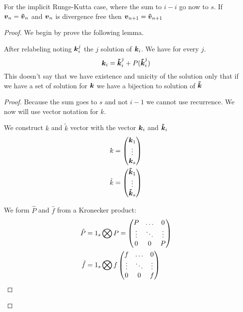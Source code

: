 \begin{theorem}
For the implicit Runge-Kutta case, where the sum to $i-i$ go now to $s$.
If ${\boldsymbol {v}}_{n}={\boldsymbol {\tilde{v}}}_{n}$ and ${\boldsymbol {v}}_n$ is divergence free then ${\boldsymbol {v}}_{n+1}={\boldsymbol {\tilde{v}}}_{n+1}$ 
\end{theorem}
\begin{proof}
We begin by prove the following lemma.
\begin{lemma}
After relabeling noting ${\boldsymbol {k}}_{i}^{j}$ the $j$ solution of ${\boldsymbol {k}}_{i}$.
We have for every $j$.
\begin{equation}
  {\boldsymbol {k}}_{i}={\boldsymbol {\tilde{k}}}_{i}^{j}+P({\boldsymbol {\tilde{k}}}_{i}^{j})
\end{equation}
This doesn't say that we have existence and unicity of the solution only that if we have a set of solution for ${\boldsymbol {k}}$ we have a bijection
to solution of ${\boldsymbol {\tilde{k}}}$
\end{lemma}
\begin{proof}
Because the sum goes to $s$ and not $i-1$ we cannot use recurrence.
We now will use vector notation for $k$.

We construct $k$ and $\tilde{k}$ vector with the vector ${\boldsymbol {k}}_{i}$ and ${\boldsymbol {\tilde{k}}}_{i}$
\begin{align}
k&=\begin{pmatrix}
    {\boldsymbol {k}}_{1}\\
    \vdots\\
    {\boldsymbol {k}}_{s}\\
  \end{pmatrix}\\
\tilde{k}&=\begin{pmatrix}
    {\boldsymbol {\tilde{k}}}_{1}\\
    \vdots\\
    {\boldsymbol {\tilde{k}}}_{s}\\
  \end{pmatrix}
\end{align}

We form $\hat{P}$ and $\hat{f}$ from a Kronecker product:
\begin{align}
\hat{P}&=1_{s}\bigotimes P=\begin{pmatrix}P	&\ldots	&0\\
			\vdots &\ddots 	&\vdots\\
			0	&0	&P\\
	\end{pmatrix}\\
\hat{f}&=1_{s}\bigotimes f\begin{pmatrix}f	&\ldots	&0\\
			\vdots &\ddots 	&\vdots\\
			0	&0	&f\\
	\end{pmatrix}
\end{align}


\end{proof}
\end{proof}
